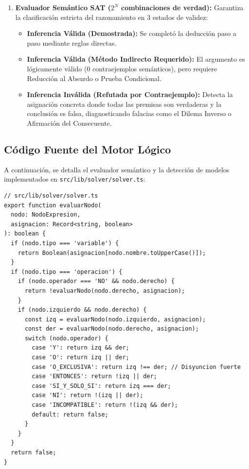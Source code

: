 \documentclass[11pt,a4paper]{article}
\begin{document}
\begin{enumerate}[label=\textbf{Fase \arabic*:}]
    \item \textbf{Evaluador Semántico SAT ($2^N$ combinaciones de verdad):}
    Garantiza la clasificación estricta del razonamiento en 3 estados de validez:
    \begin{itemize}
        \item \textbf{Inferencia Válida (Demostrada):} Se completó la deducción paso a paso mediante reglas directas.
        \item \textbf{Inferencia Válida (Método Indirecto Requerido):} El argumento es lógicamente válido ($0$ contraejemplos semánticos), pero requiere Reducción al Absurdo o Prueba Condicional.
        \item \textbf{Inferencia Inválida (Refutada por Contraejemplo):} Detecta la asignación concreta donde todas las premisas son verdaderas y la conclusión es falsa, diagnosticando falacias como el Dilema Inverso o Afirmación del Consecuente.
    \end{itemize}
\end{enumerate}

\subsection{Código Fuente del Motor Lógico}
A continuación, se detalla el evaluador semántico y la detección de modelos implementados en \texttt{src/lib/solver/solver.ts}:

\begin{lstlisting}[caption={Evaluador semántico AST y detección de contraejemplos (solver.ts).}]
// src/lib/solver/solver.ts
export function evaluarNodo(
  nodo: NodoExpresion,
  asignacion: Record<string, boolean>
): boolean {
  if (nodo.tipo === 'variable') {
    return Boolean(asignacion[nodo.nombre.toUpperCase()]);
  }
  if (nodo.tipo === 'operacion') {
    if (nodo.operador === 'NO' && nodo.derecho) {
      return !evaluarNodo(nodo.derecho, asignacion);
    }
    if (nodo.izquierdo && nodo.derecho) {
      const izq = evaluarNodo(nodo.izquierdo, asignacion);
      const der = evaluarNodo(nodo.derecho, asignacion);
      switch (nodo.operador) {
        case 'Y': return izq && der;
        case 'O': return izq || der;
        case 'O_EXCLUSIVA': return izq !== der; // Disyuncion fuerte
        case 'ENTONCES': return !izq || der;
        case 'SI_Y_SOLO_SI': return izq === der;
        case 'NI': return !(izq || der);
        case 'INCOMPATIBLE': return !(izq && der);
        default: return false;
      }
    }
  }
  return false;
}
\end{lstlisting}
\end{document}
